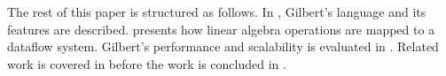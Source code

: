 

The rest of this paper is structured as follows. %
In , Gilbert's language and its features are described.
 presents how linear algebra operations are mapped to a dataflow system. Gilbert's performance and scalability is evaluated in .
Related work is covered in  before the work is concluded in .